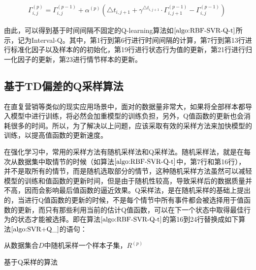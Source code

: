 \begin{equation}\label{seq:r_5}
\begin{aligned}
\Gamma^{(p)}_{i,j}=\Gamma^{(p-1)}_{i,j}+\alpha^{(p)}(\triangle t_{i,j+1} + \gamma^{\triangle t_{i,j+1}} \cdot \Gamma^{(p-1)}_{i,j+1}-\Gamma^{(p-1)}_{i,j})\;
\end{aligned}
\end{equation}

由此，可以得到基于时间间隔不固定的Q-learning算法如$\ref{algo:RBF-SVR-Q-t}$所示，记为Interval-Q。其中，第1行到第6行进行时间间隔的计算，第7行到第13行进行标准化因子以及样本的的初始化，第19行进行状态行为值的更新，第21行进行归一化因子的更新，第23进行情节样本的更新。

\subsection{基于TD偏差的Q采样算法}
在直复营销等类似的现实应用场景中，面对的数据量非常大，如果将全部样本都导入模型中进行训练，将必然会加重模型的训练负担，另外，Q值函数的更新也会消耗很多的时间。所以，为了解决以上问题，应该采取有效的采样方法来加快模型的训练，以提高值函数的更新速度。

在强化学习中，常用的采样方法有随机采样法和Q采样法\citep{abe2002empirical}。随机采样法，就是在每次从数据集中取情节的时候（如算法$\ref{algo:RBF-SVR-Q-t}$中，第7行和第16行），并不是取所有的情节，而是随机选取部分的情节，这种随机采样方法虽然可以减轻模型的训练和值函数的更新时间，但是由于随机性较高，导致采样后的数据质量并不高，因而会影响最后值函数的逼近效果。Q采样法，是在随机采样的基础上提出的，当进行Q值函数的更新的时候，不是每个情节中所有事件都会被选择用于值函数的更新，而只有那些利用当前的估计Q值函数，可以在下一个状态中取得最佳行为的状态才能被选择。即在算法$\ref{algo:RBF-SVR-Q-t}$的第16到24行替换成如下算法$\ref{algo:SVR+Q_}$的语句：

\begin{algorithm}[htbp]
\small
\SetAlgoLined
{}
从数据集合$D$中随机采样一个样本子集，$R^{(p)}$\;
\caption{基于Q采样的算法}
\label{algo:SVR+Q_}
\end{algorithm}

